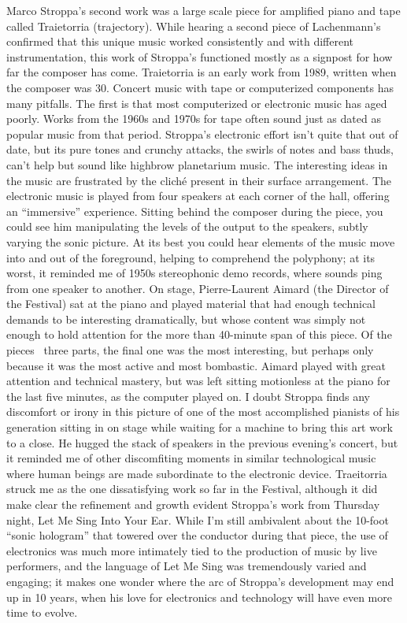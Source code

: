 Marco Stroppa’s second work was a large scale piece for amplified piano and tape called Traietorria (trajectory). While hearing a second piece of Lachenmann’s confirmed that this unique music worked consistently and with different instrumentation, this work of Stroppa’s functioned mostly as a signpost for how far the composer has come. Traietorria is an early work from 1989, written when the composer was 30. Concert music with tape or computerized components has many pitfalls. The first is that most computerized or electronic music has aged poorly. Works from the 1960s and 1970s for tape often sound just as dated as popular music from that period. Stroppa’s electronic effort isn’t quite that out of date, but its pure tones and crunchy attacks, the swirls of notes and bass thuds, can’t help but sound like highbrow planetarium music. The interesting ideas in the music are frustrated by the cliché present in their surface arrangement. The electronic music is played from four speakers at each corner of the hall, offering an “immersive” experience. Sitting behind the composer during the piece, you could see him manipulating the levels of the output to the speakers, subtly varying the sonic picture. At its best you could hear elements of the music move into and out of the foreground, helping to comprehend the polyphony; at its worst, it reminded me of 1950s stereophonic demo records, where sounds ping from one speaker to another. On stage, Pierre-Laurent Aimard (the Director of the Festival) sat at the piano and played material that had enough technical demands to be interesting dramatically, but whose content was simply not enough to hold attention for the more than 40-minute span of this piece. Of the pieces  three parts, the final one was the most interesting, but perhaps only because it was the most active and most bombastic. Aimard played with great attention and technical mastery, but was left sitting motionless at the piano for the last five minutes, as the computer played on. I doubt Stroppa finds any discomfort or irony in this picture of one of the most accomplished pianists of his generation sitting in on stage while waiting for a machine to bring this art work to a close. He hugged the stack of speakers in the previous evening’s concert, but it reminded me of other discomfiting moments in similar technological music where human beings are made subordinate to the electronic device. Traeitorria struck me as the one dissatisfying work so far in the Festival, although it did make clear the refinement and growth evident Stroppa’s work from Thursday night, Let Me Sing Into Your Ear. While I’m still ambivalent about the 10-foot “sonic hologram” that towered over the conductor during that piece, the use of electronics was much more intimately tied to the production of music by live performers, and the language of Let Me Sing was tremendously varied and engaging; it makes one wonder where the arc of Stroppa’s development may end up in 10 years, when his love for electronics and technology will have even more time to evolve.
